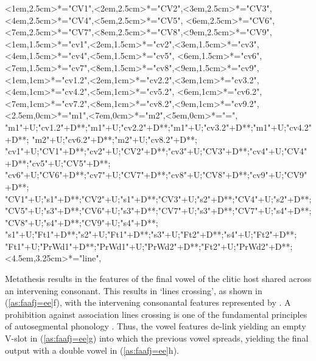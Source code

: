 \begin{multicols}{2}
\begin{exe}
{\begin{xlist}
{		<1em,2.5cm>*="CV1",<2em,2.5cm>*="CV2",<3em,2.5cm>*="CV3",<4em,2.5cm>*="CV4",<5em,2.5cm>*="CV5",
		<6em,2.5cm>*="CV6",<7em,2.5cm>*="CV7",<8em,2.5cm>*="CV8",<9em,2.5cm>*="CV9",
		<1em,1.5cm>*="cv1",<2em,1.5cm>*="cv2",<3em,1.5cm>*="cv3",<4em,1.5cm>*="cv4",<5em,1.5cm>*\as{\j}="cv5",
		<6em,1.5cm>*="cv6",<7em,1.5cm>*\as{ }="cv7",<8em,1.5cm>*="cv8",<9em,1.5cm>*\as{ }="cv9",
		<1em,1cm>*="cv1.2",<2em,1cm>*="cv2.2",<3em,1cm>*="cv3.2",<4em,1cm>*="cv4.2",<5em,1cm>*\as{\j}="cv5.2",
		<6em,1cm>*="cv6.2",<7em,1cm>*\as{ }="cv7.2",<8em,1cm>*="cv8.2",<9em,1cm>*\as{ }="cv9.2",
		<2.5em,0cm>*="m1",<7em,0cm>*="m2",<5em,0cm>*\as{=}="=",
		"m1"+U;"cv1.2"+D**\dir{-};"m1"+U;"cv2.2"+D**\dir{-};"m1"+U;"cv3.2"+D**\dir{-};"m1"+U;"cv4.2"+D**\dir{-};
		"m2"+U;"cv6.2"+D**\dir{-};"m2"+U;"cv8.2"+D**\dir{-};
		"cv1"+U;"CV1"+D**\dir{-};"cv2"+U;"CV2"+D**\dir{-};"cv3"+U;"CV3"+D**\dir{-};"cv4"+U;"CV4"+D**\dir{-};"cv5"+U;"CV5"+D**\dir{-};
		"cv6"+U;"CV6"+D**\dir{-};"cv7"+U;"CV7"+D**\dir{};"cv8"+U;"CV8"+D**\dir{-};"cv9"+U;"CV9"+D**\dir{};
		"CV1"+U;"s1"+D**\dir{-};"CV2"+U;"s1"+D**\dir{-};"CV3"+U;"s2"+D**\dir{-};"CV4"+U;"s2"+D**\dir{-};
		"CV5"+U;"s3"+D**\dir{-};"CV6"+U;"s3"+D**\dir{-};"CV7"+U;"s3"+D**\dir{-};"CV7"+U;"s4"+D**\dir{-};"CV8"+U;"s4"+D**\dir{-};"CV9"+U;"s4"+D**\dir{-};
		"s1"+U;"Ft1"+D**\dir{-};"s2"+U;"Ft1"+D**\dir{-};"s3"+U;"Ft2"+D**\dir{-};"s4"+U;"Ft2"+D**\dir{-};
		"Ft1"+U;"PrWd1"+D**\dir{-};"PrWd1"+U;"PrWd2"+D**\dir{-};"Ft2"+U;"PrWd2"+D**\dir{-};
		<4.5em,3.25cm>*="line",
	\endxy}
	\end{xlist}}
\end{exe}
\end{multicols}

Metathesis results in the features of the final vowel of the clitic host
shared across an intervening consonant.
This results in `lines crossing', as shown in (\ref{as:faafj=ee}f),
with the intervening consonantal features represented by \tsc{[+c.]}.
A prohibition against association lines crossing is one of the fundamental
principles of autosegmental phonology \citep[48]{go76}.
Thus, the vowel features de-link
yielding an empty V-slot in (\ref{as:faafj=ee}g) into which the previous vowel spreads,
yielding the final output with a double vowel in (\ref{as:faafj=ee}h).

